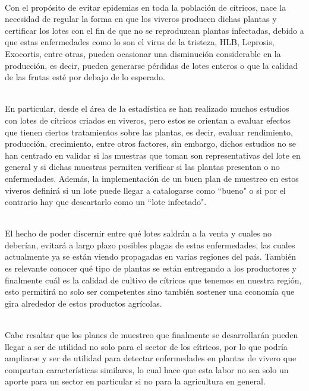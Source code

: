 ~\\Con el prop\'{o}sito de evitar epidemias en toda la poblaci\'{o}n de c\'{i}tricos, nace la necesidad de regular la forma en que los viveros producen dichas plantas y certificar los lotes con el fin de que no se reproduzcan plantas infectadas, debido a que estas enfermedades como lo son el virus de la tristeza, HLB, Leprosis, Exocortis, entre otras, pueden ocasionar una disminuci\'{o}n considerable en la producci\'{o}n, es decir, pueden generarse p\'{e}rdidas de lotes enteros o que la calidad de las frutas est\'{e} por debajo de lo esperado. 

~\\En particular, desde el \'{a}rea de la estad\'{i}stica se han realizado muchos estudios con lotes de c\'{i}tricos criados en viveros, pero estos se orientan a evaluar efectos que tienen ciertos tratamientos sobre las plantas, es decir, evaluar rendimiento, producci\'{o}n, crecimiento, entre otros factores, sin embargo, dichos estudios no se han centrado en validar si las muestras que toman son representativas del lote en general y si dichas muestras permiten verificar si las plantas presentan o no enfermedades. Adem\'{a}s, la implementaci\'{o}n de un buen plan de muestreo en estos viveros definir\'{a} si un lote puede llegar a catalogarse como ``bueno"  o si por el contrario hay que descartarlo como un ``lote infectado".

~\\El hecho de poder discernir entre qu\'{e} lotes saldr\'{a}n a la venta y cuales no deber\'{i}an, evitar\'{a} a largo plazo posibles plagas de estas enfermedades, las cuales actualmente ya se est\'{a}n viendo propagadas en varias regiones del pa\'{i}s. Tambi\'{e}n es relevante conocer qu\'{e} tipo de plantas se est\'{a}n entregando a los productores y finalmente cu\'{a}l es la calidad de cultivo de c\'{i}tricos que tenemos en nuestra regi\'{o}n, esto permitir\'{a} no solo ser competentes sino tambi\'{e}n sostener una econom\'{i}a que gira alrededor de estos productos agr\'{i}colas.

~\\Cabe resaltar que los planes de muestreo que finalmente se desarrollar\'{a}n pueden llegar a ser de utilidad no solo para el sector de los c\'{i}tricos, por lo que podr\'{i}a ampliarse y ser de utilidad para detectar enfermedades en plantas de vivero que compartan caracter\'{i}sticas similares, lo cual hace que esta labor no sea solo un aporte para un sector en particular si no para la agricultura en general. 


